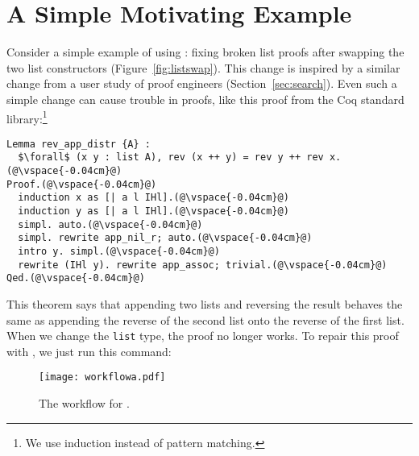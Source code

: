 \section{A Simple Motivating Example}
\label{sec:overview}

Consider a simple example of using \toolname: fixing broken list proofs after swapping the two list constructors (Figure~\ref{fig:listswap}).
This change is inspired by a similar change from a user study of proof engineers (Section~\ref{sec:search}).
Even such a simple change can cause trouble in proofs, like this proof from the Coq standard library:\footnote{We use induction instead of pattern matching.}

\begin{lstlisting}
Lemma rev_app_distr {A} :
  $\forall$ (x y : list A), rev (x ++ y) = rev y ++ rev x.(@\vspace{-0.04cm}@)
Proof.(@\vspace{-0.04cm}@)
  induction x as [| a l IHl].(@\vspace{-0.04cm}@)
  induction y as [| a l IHl].(@\vspace{-0.04cm}@)
  simpl. auto.(@\vspace{-0.04cm}@)
  simpl. rewrite app_nil_r; auto.(@\vspace{-0.04cm}@)
  intro y. simpl.(@\vspace{-0.04cm}@)
  rewrite (IHl y). rewrite app_assoc; trivial.(@\vspace{-0.04cm}@)
Qed.(@\vspace{-0.04cm}@)
\end{lstlisting}
This theorem says that appending two lists and reversing the result behaves the same as appending
the reverse of the second list onto the reverse of the first list.
When we change the \lstinline{list} type, the proof no longer works.
To repair this proof with \toolname, we just run this command:

\begin{figure}
\texttt{[image: workflowa.pdf]}
\vspace{-0.5cm}
\caption{The workflow for \toolname.}
\label{fig:system}
\end{figure}

